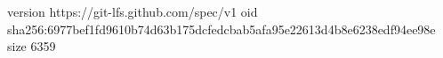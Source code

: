 version https://git-lfs.github.com/spec/v1
oid sha256:6977bef1fd9610b74d63b175dcfedcbab5afa95e22613d4b8e6238edf94ee98e
size 6359
